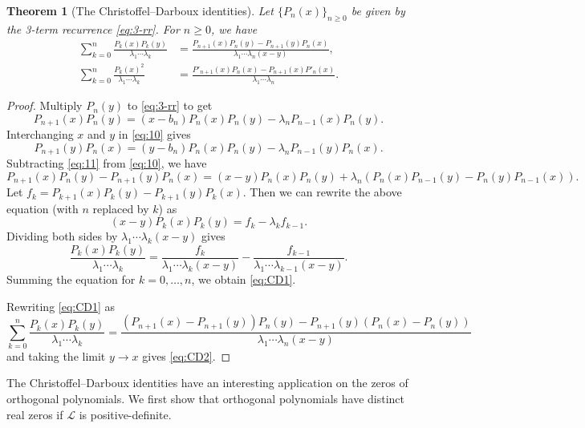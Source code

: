 \documentclass[oneside]{book}
\numberwithin{equation}{section}
\newtheorem{thm}{Theorem}[section]
\theoremstyle{definition}
\newcommand\LL{\mathcal{L}}
\begin{document}
\begin{thm}[The Christoffel--Darboux identities]
  Let \( \{ P_n(x) \}_{n\ge 0} \) be given by the 3-term recurrence
  \eqref{eq:3-rr}. For \( n\ge0 \), we have
\begin{align}
  \label{eq:CD1}
  \sum_{k=0}^{n} \frac{P_k(x)P_k(y)}{\lambda_1\cdots\lambda_k}
  &= \frac{P_{n+1}(x)P_{n}(y) - P_{n+1}(y)P_{n}(x)}{\lambda_1\cdots\lambda_{n}(x-y)}, \\
  \label{eq:CD2}
  \sum_{k=0}^{n} \frac{P_k(x)^2}{\lambda_1\cdots\lambda_k}
  &= \frac{P'_{n+1}(x)P_{n}(x) - P_{n+1}(x)P'_{n}(x)}{\lambda_1\cdots\lambda_{n}}.
\end{align}
\end{thm}
\begin{proof}
  Multiply \( P_n(y) \) to \eqref{eq:3-rr} to get
  \begin{equation}\label{eq:10}
    P_{n+1}(x) P_n(y) = (x-b_n) P_n(x) P_n(y) - \lambda_n P_{n-1}(x) P_n(y).
  \end{equation}
  Interchanging \( x \) and \( y \) in \eqref{eq:10} gives
  \begin{equation}\label{eq:11}
    P_{n+1}(y) P_n(x) = (y-b_n) P_n(x) P_n(y) - \lambda_n P_{n-1}(y) P_n(x).
  \end{equation}
  Subtracting \eqref{eq:11} from \eqref{eq:10}, we have
  \[
    P_{n+1}(x) P_n(y) - P_{n+1}(y) P_n(x) = (x-y) P_n(x) P_n(y)
    + \lambda_n (P_n(x)P_{n-1}(y) - P_n(y)P_{n-1}(x)).
  \]
  Let \( f_k = P_{k+1}(x)P_{k}(y) - P_{k+1}(y)P_{k}(x) \). Then we can
  rewrite the above equation (with \( n \) replaced by \( k \)) as
  \[
    (x-y) P_k(x)P_k(y) = f_{k} - \lambda_k f_{k-1}.
  \]
  Dividing both sides by \( \lambda_1\cdots\lambda_k(x-y) \) gives
  \[
    \frac{P_k(x)P_k(y)}{\lambda_1\cdots\lambda_k} =
    \frac{f_{k}}{\lambda_1\cdots\lambda_k(x-y)} -
    \frac{f_{k-1}}{\lambda_1\cdots\lambda_{k-1}(x-y)}.
  \]
  Summing the equation for \( k=0,\dots,n \), we obtain \eqref{eq:CD1}.

  Rewriting  \eqref{eq:CD1} as
  \[
  \sum_{k=0}^{n} \frac{P_k(x)P_k(y)}{\lambda_1\cdots\lambda_k}
    = \frac{(P_{n+1}(x)-P_{n+1}(y))P_{n}(y) -
      P_{n+1}(y)(P_{n}(x)-P_{n}(y))}{\lambda_1\cdots\lambda_{n}(x-y)}
  \]
  and taking the limit \( y\to x \) gives \eqref{eq:CD2}.
\end{proof}

The Christoffel--Darboux identities have an interesting application on
the zeros of orthogonal polynomials. We first show that orthogonal
polynomials have distinct real zeros if \( \LL \) is
positive-definite.
\end{document}
